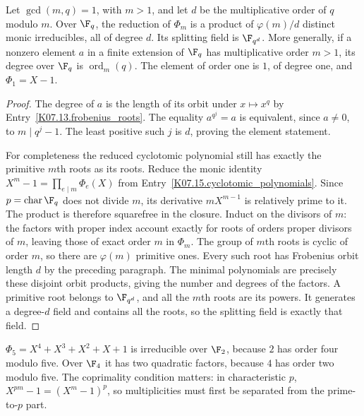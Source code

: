\begin{theorem}
Let $\gcd(m,q)=1$, with $m>1$, and let $d$ be the multiplicative order of $q$ modulo $m$. Over $\F_q$, the reduction of $\Phi_m$ is a product of $\varphi(m)/d$ distinct monic irreducibles, all of degree $d$. Its splitting field is $\F_{q^d}$. More generally, if a nonzero element $a$ in a finite extension of $\F_q$ has multiplicative order $m>1$, its degree over $\F_q$ is $\operatorname{ord}_m(q)$. The element of order one is $1$, of degree one, and $\Phi_1=X-1$.
\end{theorem}
\begin{proof}
The degree of $a$ is the length of its orbit under $x\mapsto x^q$ by Entry~\ref{K07.13.frobenius_roots}. The equality $a^{q^j}=a$ is equivalent, since $a\ne0$, to $m\mid q^j-1$. The least positive such $j$ is $d$, proving the element statement.

For completeness the reduced cyclotomic polynomial still has exactly the primitive $m$th roots as its roots. Reduce the monic identity $X^m-1=\prod_{e\mid m}\Phi_e(X)$ from Entry~\ref{K07.15.cyclotomic_polynomials}. Since $p=\operatorname{char}\F_q$ does not divide $m$, its derivative $mX^{m-1}$ is relatively prime to it. The product is therefore squarefree in the closure. Induct on the divisors of $m$: the factors with proper index account exactly for roots of orders proper divisors of $m$, leaving those of exact order $m$ in $\Phi_m$. The group of $m$th roots is cyclic of order $m$, so there are $\varphi(m)$ primitive ones. Every such root has Frobenius orbit length $d$ by the preceding paragraph. The minimal polynomials are precisely these disjoint orbit products, giving the number and degrees of the factors. A primitive root belongs to $\F_{q^d}$, and all the $m$th roots are its powers. It generates a degree-$d$ field and contains all the roots, so the splitting field is exactly that field.
\end{proof}
\begin{example}
$\Phi_5=X^4+X^3+X^2+X+1$ is irreducible over $\F_2$, because $2$ has order four modulo five. Over $\F_4$ it has two quadratic factors, because $4$ has order two modulo five. The coprimality condition matters: in characteristic $p$, $X^{pm}-1=(X^m-1)^p$, so multiplicities must first be separated from the prime-to-$p$ part.
\end{example}

